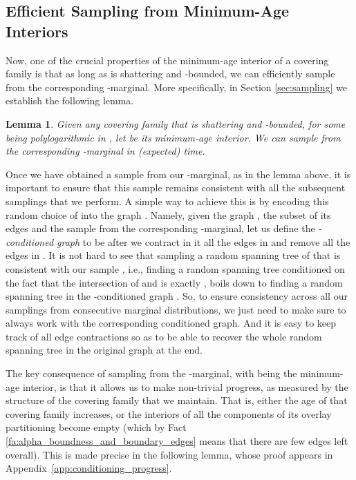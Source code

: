 \documentclass[11pt, letterpaper]{article}
\newtheorem{lemma}[theorem]{Lemma}
\begin{document}
\subsection{Efficient Sampling from Minimum-Age Interiors}

Now, one of the crucial properties of the minimum-age interior  of a covering family  is that as long as  is shattering and -bounded, we can efficiently sample from the corresponding -marginal. More specifically, in Section \ref{sec:sampling} we establish the following lemma.


\begin{lemma}
\label{lem:conditioning_main}
Given any covering family  that is shattering and -bounded, for some  being polylogarithmic in , let  be its minimum-age interior. We can sample from the corresponding -marginal in (expected)  time.
\end{lemma}

Once we have obtained a sample  from our -marginal, as in the lemma above, it is important to ensure that this sample remains consistent with all the subsequent samplings that we perform. A simple way to achieve this is by encoding this random choice of  into the graph . Namely, given the graph , the subset  of its edges and the sample  from the corresponding -marginal, let us define the {\em -conditioned graph}  to be  after we contract in it all the edges in  and remove all the edges in . It is not hard to see that sampling a random spanning tree of  that is consistent with our sample , i.e., finding a random spanning tree  conditioned on the fact that the intersection of  and  is exactly , boils down to finding a random spanning tree in the -conditioned graph . So, to ensure consistency across all our samplings from consecutive marginal distributions, we just need to make sure to always work with the corresponding conditioned graph. And it is easy to keep track of all edge contractions so as to be able to recover the whole random spanning tree in the original graph at the end.

The key consequence of sampling from the -marginal, with  being the minimum-age interior, is that it allows us to make non-trivial progress, as measured by the structure of the covering family that we maintain. That is, either the age of that covering family increases, or the interiors of all the components of its overlay partitioning become empty (which by Fact \ref{fa:alpha_boundness_and_boundary_edges} means that there are few edges left overall). This is made precise in the following lemma, whose proof appears in Appendix~\ref{app:conditioning_progress}.
\end{document}
